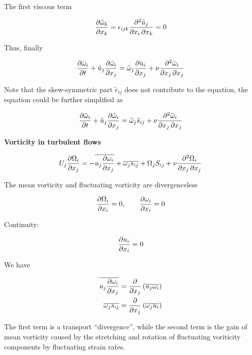 \documentclass{article}
\begin{document}
The first viscous term

\begin{equation*}
    \frac{\mathop{}\!\partial \tilde{\omega}_k}{\mathop{}\!\partial x_k}=\epsilon_{ijk}\frac{\mathop{}\!\partial^2\tilde{u}_j}{\mathop{}\!\partial x_i\mathop{}\!\partial x_k}=0
\end{equation*}

Thus, finally

\begin{equation*}
    \frac{\p \tilde\omega_i}{\p t}+\tilde u_j\frac{\p\tilde\omega_i}{\p x_j}=\tilde\omega_j\frac{\p\tilde u_i}{\p x_j}+\nu\frac{\p^2\tilde\omega_i}{\p x_j\p x_j}
\end{equation*}

Note that the skew-symmetric part $\tilde r_{ij}$ does not contribute to the equation, the equation could be further simplified as

\begin{equation*}
    \frac{\mathop{}\!\partial \tilde\omega_i}{\mathop{}\!\partial t}+\tilde u_j\frac{\mathop{}\!\partial\tilde\omega_i}{\mathop{}\!\partial x_j}=\tilde\omega_j\tilde s_{ij}+\nu\frac{\mathop{}\!\partial^2\tilde\omega_i}{\mathop{}\!\partial x_j\mathop{}\!\partial x_j}
\end{equation*}

\textbf{Vorticity in turbulent flows}

\begin{equation*}
    U_j\frac{\mathop{}\!\partial \Omega_i}{\mathop{}\!\partial x_j}=-\overline{u_j\frac{\mathop{}\!\partial\omega_i}{\mathop{}\!\partial x_j}}+\overline{{\omega_j} s_{ij}}+\Omega_jS_{ij}+\nu\frac{\mathop{}\!\partial^2\Omega_i}{\mathop{}\!\partial x_j\mathop{}\!\partial x_j}
\end{equation*}

The mean vorticity and fluctuating vorticity are divergenceless

\begin{equation*}
    \frac{\mathop{}\!\partial\Omega_i}{\mathop{}\!\partial x_i}=0,\qquad\frac{\mathop{}\!\partial\omega_i}{\mathop{}\!\partial x_i}=0
\end{equation*}

Continuity:

\begin{equation*}
    \frac{\mathop{}\!\partial u_i}{\mathop{}\!\partial x_i}=0
\end{equation*}

We have

\begin{align*}
    \overline{u_j\frac{\mathop{}\!\partial\omega_i}{\mathop{}\!\partial x_j}}&=\frac{\mathop{}\!\partial}{\mathop{}\!\partial x_j}\left(\overline{u_j\omega_i}\right)\\
    \overline{{\omega_j} s_{ij}}&=\frac{\mathop{}\!\partial}{\mathop{}\!\partial x_j}\left(\overline{\omega_j u_i}\right)
\end{align*}

The first term is a transport ``divergence'', while the second term is the gain of mean vorticity caused by the stretching and rotation of fluctuating voriticity components by fluctuating strain rates.
\end{document}
